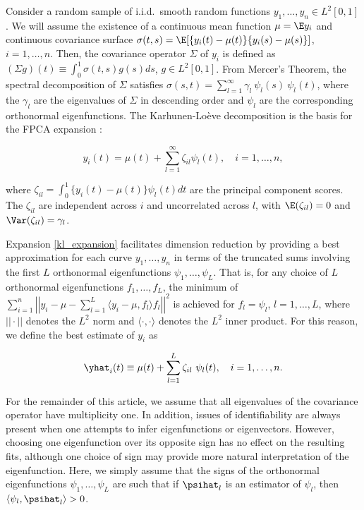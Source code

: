 \documentclass[ba]{imsart}
\numberwithin{equation}{section}
\theoremstyle{plain}
\begin{document}
Consider a random sample of i.i.d.\ smooth random functions $y_1, \dots, y_n \in L^2 [0, 1]$. We will assume the
existence of a continuous mean function $\mu = \E y_i$ and continuous covariance surface
$\sigma (t, s) = \E [ \{ y_i (t) - \mu (t) \} \{ y_i (s) - \mu (s) \} ]$, $i = 1, \dots, n$.
Then, the covariance operator $\Sigma$ of $y_i$ is defined as $(\Sigma g) (t) \equiv \int_0^1 \sigma (t, s) g(s) ds$, 
$g \in L^2 [0, 1]$. From Mercer's Theorem, the spectral decomposition of $\Sigma$ satisfies $\sigma (s, t) =
\sum_{l=1}^\infty \gamma_l \ \psi_l (s) \ \psi_l (t)$, where the $\gamma_l$ are the eigenvalues of
$\Sigma$ in descending
order and $\psi_l$ are the corresponding orthonormal eigenfunctions. The Karhunen-Lo\`{e}ve decomposition
is the basis for the FPCA expansion \citep{yao05}:

\begin{equation}
	y_i (t) = \mu (t) + \sum_{l=1}^\infty \zeta_{il} \psi_l (t), \quad i = 1, \dots, n,
\label{kl_expansion}
\end{equation}

\noindent where $\zeta_{il} = \int_0^1 \{ y_i (t) - \mu(t) \} \psi_l(t) dt$ are the principal component
scores. The $\zeta_{il}$ are independent across $i$ and uncorrelated across $l$, with $\E (\zeta_{il}) = 0$
and $\Var (\zeta_{il}) = \gamma_l$.

Expansion \eqref{kl_expansion} facilitates dimension reduction by providing a best approximation for each
curve $y_1, \dots, y_n$ in terms of the truncated sums involving the first $L$ orthonormal eigenfunctions
$\psi_1, \dots, \psi_L$. That is, for any choice of $L$ orthonormal eigenfunctions $f_1, \dots, f_L$, the
minimum of $\sum_{i=1}^n \left|\left| y_i - \mu - \sum_{l=1}^L \langle y_i - \mu , f_l \rangle f_l \right|\right|^2$
is achieved for $f_l = \psi_l$, $l = 1, \dots, L$, where $|| \cdot ||$ denotes the $L^2$ norm and
$\langle \cdot, \cdot \rangle$ denotes the $L^2$ inner product. For this reason, we define the best estimate of
$y_i$ as

\begin{equation}
	\yhat_i (t) \equiv \mu (t) + \sum_{l=1}^L \zeta_{il} \ \psi_l (t), \quad i = 1, \dots, n.
\label{yhat}
\end{equation}

For the remainder of this article, we assume that all eigenvalues of the covariance operator have multiplicity one.
In addition, issues of identifiability are always present when one attempts to infer eigenfunctions or eigenvectors.
However, choosing one eigenfunction over its opposite sign has no effect on the resulting fits, although one choice
of sign may provide more natural interpretation of the eigenfunction. Here, we simply assume that
the signs of the orthonormal eigenfunctions $\psi_1, \dots, \psi_L$ are such that if $\psihat_l$ is an
estimator of $\psi_l$, then $\langle \psi_l , \psihat_l \rangle > 0$.
\end{document}

